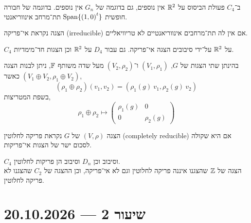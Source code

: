 \begin{example}
	ב־$C_4$ פעולת הביסוס על $\mathbb{R}^2$ אין נוספים,
	גם בדוגמה של $G_n$ אין נוספים.
	בדוגמה של חבורה חופשית $\operatorname{Span}\{ {(1, 0)}^t \}$ תת־מרחב אינווריאנטי.
\end{example}
\begin{definition}
	הצגה נקראת אי־פריקה (irreducible) אם אין לה תת־מרחבים אינווריאנטיים לא טריוויאליים.
\end{definition}
\begin{example}
	$C_4$ על $\mathbb{R}^2$ על־ידי סיבובים הצגה אי־פריקה.
	גם עבור $D_4$ על $\mathbb{R}^2$ וכן הצגות חד־מימדיות.
\end{example}
בהינתן שתי הצגות של $G$, $(V_1, \rho_1)$ ו־$(V_2, \rho_2)$ מעל שדה משותף $\mathbb{F}$,
ניתן לבנות הצגה $(V_1 \oplus V_2, \rho_1 \oplus V_2)$ כאשר,
\[
	(\rho_1 \oplus \rho_2)(v_1, v_2)
	= (\rho_1(g)\ v_1, \rho_2(g)\ v_2)
\]
בשפת המטריצות,
\[
	\rho_1 \oplus \rho_2
	\mapsto
	\begin{pmatrix}
		\rho_1(g) & 0 \\
		0 & \rho_2(g)
	\end{pmatrix}
\]
\begin{definition}
	הצגה $(V, \rho)$ של $G$ נקראת פריקה לחלוטין (completely reducible) אם היא שקולה לסכום ישר של הצגות אי־פריקות.
\end{definition}
\begin{example}
	$C_4$ וסיבוב וכן $D_n$ וסיבוב הן פריקות לחלוטין. \\
	הצגה של $\mathbb{Z}$ שהצגנו איננה פריקה לחלוטין וגם לא אי־פריקה, וכן ההצגה של $C_2$ שהצגנו לא פריקה לחלוטין.
\end{example}

\section{שיעור 2 --- 20.10.2026}
